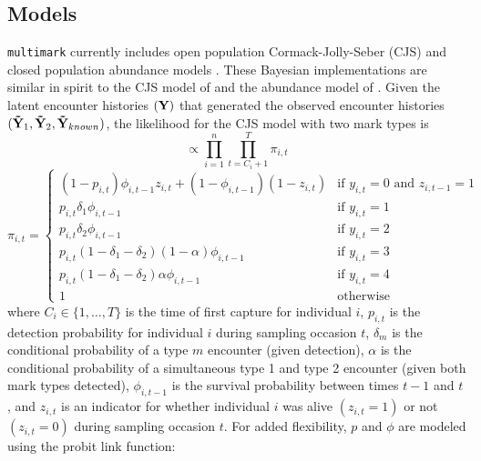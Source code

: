\documentclass[12pt]{article}
\begin{document}
\subsection{Models}

\verb|multimark| currently includes open population Cormack-Jolly-Seber (CJS) and closed population abundance models \citep[e.g.,][]{WilliamsEtAl2002}. These Bayesian implementations are similar in spirit to the CJS model of \cite{Royle2008} and the abundance model of \cite{KingEtAl2015}. Given the latent encounter histories $({\bf Y})$ that generated the observed encounter histories $({\bf {\tilde Y}}_1, {\bf {\tilde Y}}_2, {\bf {\tilde Y}}_{known})$, the likelihood for the CJS model with two mark types is
\begin{equation}
  [ {\bf Y} \mid {\bf p}, {\boldsymbol \delta}, \alpha, \boldsymbol{\phi}, {\bf Z}] \propto \prod_{i=1}^{n} \prod_{t=C_i+1}^T \pi_{i,t}
  \label{eq:CJSlike}
\end{equation}
\begin{equation*}
  \pi_{i,t} = \begin{cases}
                \left( 1-p_{i,t} \right) \phi_{i,t-1} z_{i,t} + \left( 1-\phi_{i,t-1} \right) \left( 1- z_{i,t} \right)  & \text{if } y_{i,t}=0 \text{ and } z_{i,t-1}=1\\
                p_{i,t} \delta_1 \phi_{i,t-1}  & \text{if } y_{i,t}=1\\
                p_{i,t} \delta_2 \phi_{i,t-1}  & \text{if } y_{i,t}=2\\
                p_{i,t} \left( 1 - \delta_1 - \delta_2 \right) \left( 1 - \alpha \right) \phi_{i,t-1}  & \text{if } y_{i,t}=3\\
                p_{i,t} \left( 1 - \delta_1 - \delta_2 \right) \alpha \phi_{i,t-1}  & \text{if } y_{i,t}=4\\
                1 & \text{otherwise}
              \end{cases}
\end{equation*}
where $C_i \in \{ 1,\ldots,T \}$ is the time of first capture for individual $i$, $p_{i,t}$ is the detection probability for individual $i$ during sampling occasion $t$, $\delta_m$ is the conditional probability of a type $m$ encounter (given detection), $\alpha$ is the conditional probability of a simultaneous type 1 and type 2 encounter (given both mark types detected), $\phi_{i,t-1}$ is the survival probability between times $t-1$ and $t$, and $z_{i,t}$ is an indicator for whether individual $i$ was alive $(z_{i,t}=1)$ or not $(z_{i,t}=0)$ during sampling occasion $t$. For added flexibility, $p$ and $\phi$ are modeled using the probit link function:
\end{document}
